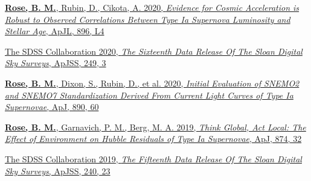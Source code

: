 \documentclass[margin]{res}
\begin{document}
\begin{resume}



\hangindent=15pt 
\href{https://ui.adsabs.harvard.edu/abs/2020ApJ...896L...4R/abstract}{{\bf Rose, B. M.}, Rubin, D., Cikota, A. 2020, {\sl Evidence for Cosmic Acceleration is Robust to Observed Correlations Between Type Ia Supernova Luminosity and Stellar Age}, ApJL, 896, L4}
\vspace{-12pt}

\hangindent=15pt 
\href{https://ui.adsabs.harvard.edu/abs/2020ApJS..249....3A/abstract}{The SDSS Collaboration 2020, {\sl The Sixteenth Data Release Of The Sloan Digital Sky Surveys}, ApJSS, 249, 3}
\vspace{-12pt}


\hangindent=15pt
\href{https://ui.adsabs.harvard.edu/#abs/2019arXiv191209993R/abstract}{{\bf Rose, B. M.}, Dixon, S., Rubin, D., et al.  2020, {\sl Initial Evaluation of SNEMO2 and SNEMO7 Standardization Derived From Current Light Curves of Type Ia Supernovae}, ApJ, 890, 60} %
\vspace{-12pt}

\hangindent=15pt 
\href{https://ui.adsabs.harvard.edu/#abs/2019arXiv190201433R/abstract}{{\bf Rose, B. M.}, Garnavich, P. M., Berg, M. A. 2019, {\sl Think Global, Act Local: The Effect of Environment on Hubble Residuals of Type Ia Supernovae}, ApJ, 874, 32}
\vspace{-12pt}

\hangindent=15pt 
\href{https://ui.adsabs.harvard.edu/#abs/2018arXiv181202759A/abstract}{The SDSS Collaboration 2019, {\sl The Fifteenth Data Release Of The Sloan Digital Sky Surveys}, ApJSS, 240, 23}
\vspace{-12pt}


\end{resume}
\end{document}

